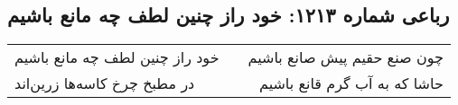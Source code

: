 \begin{center}
\section*{رباعی شماره ۱۲۱۳: خود راز چنین لطف چه مانع باشیم}
\label{sec:1213}
\begin{longtable}{l p{0.5cm} r}
خود راز چنین لطف چه مانع باشیم
&&
چون صنع حقیم پیش صانع باشیم
\\
در مطبخ چرخ کاسه‌ها زرین‌اند
&&
حاشا که به آب گرم قانع باشیم
\\
\end{longtable}
\end{center}
